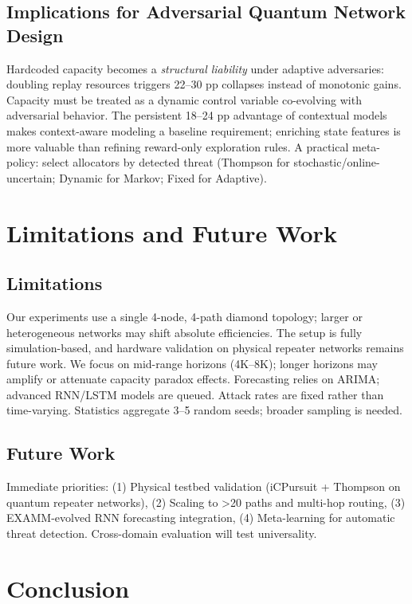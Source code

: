 \documentclass[sigconf,anonymous]{acmart}
\begin{document}
\subsection{Implications for Adversarial Quantum Network Design}

Hardcoded capacity becomes a \textit{structural liability} under adaptive adversaries: doubling replay resources triggers 22--30 pp collapses instead of monotonic gains. Capacity must be treated as a dynamic control variable co-evolving with adversarial behavior. The persistent 18--24 pp advantage of contextual models makes context-aware modeling a baseline requirement; enriching state features is more valuable than refining reward-only exploration rules. A practical meta-policy: select allocators by detected threat (Thompson for stochastic/online-uncertain; Dynamic for Markov; Fixed for Adaptive).

\section{Limitations and Future Work}
\label{sec:limitations}

\subsection{Limitations}

Our experiments use a single 4-node, 4-path diamond topology; larger or heterogeneous networks may shift absolute efficiencies. The setup is fully simulation-based, and hardware validation on physical repeater networks remains future work. We focus on mid-range horizons (4K--8K); longer horizons may amplify or attenuate capacity paradox effects. Forecasting relies on ARIMA; advanced RNN/LSTM models are queued. Attack rates are fixed rather than time-varying. Statistics aggregate 3--5 random seeds; broader sampling is needed.

\subsection{Future Work}

Immediate priorities: (1) Physical testbed validation (iCPursuit + Thompson on quantum repeater networks), (2) Scaling to >20 paths and multi-hop routing, (3) EXAMM-evolved RNN forecasting integration, (4) Meta-learning for automatic threat detection. Cross-domain evaluation will test universality.

\section{Conclusion}
\label{sec:conclusion}
\end{document}
